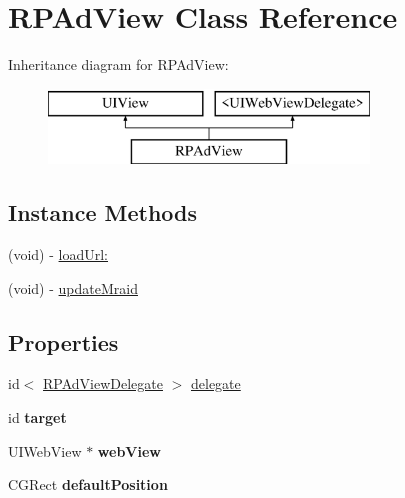 \hypertarget{interface_r_p_ad_view}{\section{R\-P\-Ad\-View Class Reference}
\label{interface_r_p_ad_view}
}
Inheritance diagram for R\-P\-Ad\-View\-:\begin{figure}[H]
\begin{center}
\leavevmode
\includegraphics[height=2.000000cm]{interface_r_p_ad_view}
\end{center}
\end{figure}
\subsection*{Instance Methods}
\begin{DoxyCompactItemize}
\item 
(void) -\/ \hyperlink{interface_r_p_ad_view_aff8c4f36e93246fb82f515c9d9160a0a}{load\-Url\-:}
\item 
(void) -\/ \hyperlink{interface_r_p_ad_view_a4ba816f5532ecb8471470b5b9ff9d062}{update\-Mraid}
\end{DoxyCompactItemize}
\subsection*{Properties}
\begin{DoxyCompactItemize}
\item 
id$<$ \hyperlink{protocol_r_p_ad_view_delegate-p}{R\-P\-Ad\-View\-Delegate} $>$ \hyperlink{interface_r_p_ad_view_a86000abff15eb9956886e64f21574e4a}{delegate}
\item 
\hypertarget{interface_r_p_ad_view_a5f9b3decb6e6bd876a108c3ab9be3740}{id {\bfseries target}}\label{interface_r_p_ad_view_a5f9b3decb6e6bd876a108c3ab9be3740}

\item 
\hypertarget{interface_r_p_ad_view_a7278a313c9eb39582f58540c4ae86bf8}{U\-I\-Web\-View $\ast$ {\bfseries web\-View}}\label{interface_r_p_ad_view_a7278a313c9eb39582f58540c4ae86bf8}

\item 
\hypertarget{interface_r_p_ad_view_a90887d02de93010d1ff5e488b58a46f5}{C\-G\-Rect {\bfseries default\-Position}}\label{interface_r_p_ad_view_a90887d02de93010d1ff5e488b58a46f5}

\end{DoxyCompactItemize}


